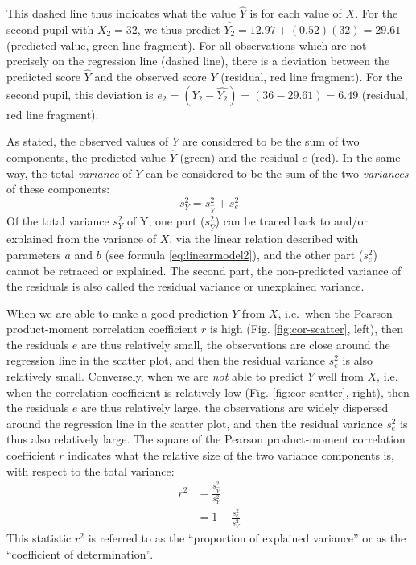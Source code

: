 \documentclass[
]{book}
\begin{document}
This dashed line thus indicates what the value \(\widehat{Y}\) is for
each value of \(X\). For the second pupil with \(X_2 = 32\),
we thus predict \(\widehat{Y_2} = 12.97 + (0.52) (32) = 29.61\)
(predicted value, green line fragment). For all observations which are not
precisely on the regression line (dashed line),
there is a deviation between the predicted
score \(\widehat{Y}\) and the observed score \(Y\) (residual, red line
fragment). For the second pupil, this deviation is
\(e_2 = (Y_2 - \widehat{Y_2}) = (36-29.61) = 6.49\) (residual, red
line fragment).

As stated, the observed values of \(Y\) are considered to be the
sum of two components, the predicted value \(\widehat{Y}\)
(green) and the residual \(e\) (red). In the same way, the total \emph{variance}
of \(Y\) can be considered to be the sum of the two \emph{variances} of these
components:
\begin{equation}
    s^2_{Y} = s^2_{\widehat{Y}} + s^2_e
  \label{eq:variance-pred-res}
\end{equation}
Of the total variance
\(s^2_Y\) of Y, one part (\(s^2_{\widehat{Y}}\)) can be traced back to and/or
explained from the variance of \(X\), via the linear relation described
with parameters \(a\) and \(b\) (see
formula \eqref{eq:linearmodel2}), and the other part (\(s^2_e\)) cannot be retraced
or explained. The second part, the non-predicted variance of the residuals is also called
the residual variance or unexplained variance.

When we are able to make a good prediction \(Y\) from \(X\), i.e.~when the Pearson
product-moment correlation coefficient \(r\) is high
(Fig. \ref{fig:cor-scatter}, left), then the residuals \(e\) are thus relatively
small, the observations are close around the regression line in the scatter
plot, and then the residual variance \(s^2_e\) is also relatively small.
Conversely, when we are \emph{not} able to predict \(Y\) well from \(X\), i.e.
when the correlation coefficient is relatively low (Fig. \ref{fig:cor-scatter}, right),
then the residuals \(e\) are thus relatively large, the observations are widely dispersed
around the regression line in the scatter plot, and then the residual variance \(s^2_e\) is thus
also relatively large. The square of the Pearson
product-moment correlation coefficient \(r\) indicates what the relative size of the
two variance components is, with respect to the total
variance:
\begin{align}
    r^2 & = \frac{s^2_{\widehat{Y}}}{s^2_Y} \\
        & = 1 - \frac{s^2_e}{s^2_Y}
  \label{eq:r2}
\end{align}
This statistic \(r^2\) is referred to as the ``proportion of explained
variance'' or as the ``coefficient of determination''.
\end{document}
